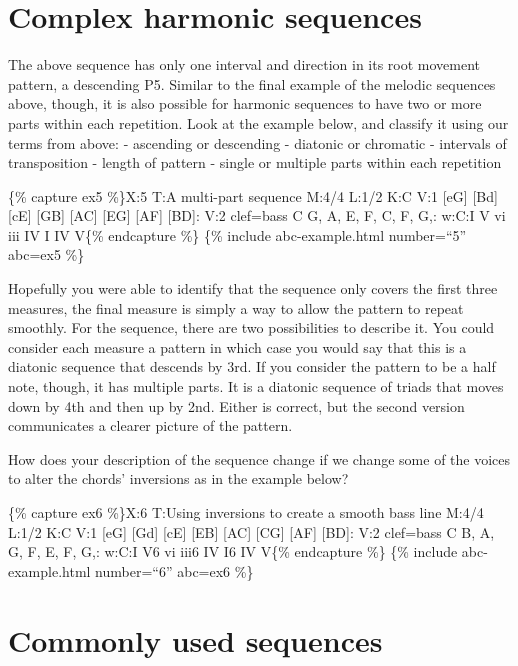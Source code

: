 \documentclass{book}
\begin{document}
\hypertarget{complex-harmonic-sequences}{%
\section{Complex harmonic sequences}\label{complex-harmonic-sequences}}

The above sequence has only one interval and direction in its root movement
pattern, a descending P5. Similar to the final example of the melodic
sequences above, though, it is also possible for harmonic sequences to have
two or more parts within each repetition. Look at the example below, and
classify it using our terms from above: - ascending or descending - diatonic
or chromatic - intervals of transposition - length of pattern - single or
multiple parts within each repetition

\{\% capture ex5 \%\}X:5 T:A multi-part sequence M:4/4 L:1/2 K:C V:1 {[}eG{]}
{[}Bd{]}\textbar{} {[}cE{]} {[}GB{]}\textbar{} {[}AC{]} {[}EG{]}\textbar{}
{[}AF{]} {[}BD{]}:\textbar{} V:2 clef=bass C G,\textbar{} A, E,\textbar{} F,
C,\textbar{} F, G,:\textbar{} w:C:I V vi iii IV I IV V\{\% endcapture \%\}
\{\% include abc-example.html number=``5'' abc=ex5 \%\}

Hopefully you were able to identify that the sequence only covers the first
three measures, the final measure is simply a way to allow the pattern to
repeat smoothly. For the sequence, there are two possibilities to describe it.
You could consider each measure a pattern in which case you would say that
this is a diatonic sequence that descends by 3rd. If you consider the pattern
to be a half note, though, it has multiple parts. It is a diatonic sequence of
triads that moves down by 4th and then up by 2nd. Either is correct, but the
second version communicates a clearer picture of the pattern.

How does your description of the sequence change if we change some of the
voices to alter the chords' inversions as in the example below?

\{\% capture ex6 \%\}X:6 T:Using inversions to create a smooth bass line M:4/4
L:1/2 K:C V:1 {[}eG{]} {[}Gd{]}\textbar{} {[}cE{]} {[}EB{]}\textbar{} {[}AC{]}
{[}CG{]}\textbar{} {[}AF{]} {[}BD{]}:\textbar{} V:2 clef=bass C B,\textbar{}
A, G,\textbar{} F, E,\textbar{} F, G,:\textbar{} w:C:I V6 vi iii6 IV I6 IV
V\{\% endcapture \%\} \{\% include abc-example.html number=``6'' abc=ex6 \%\}

\hypertarget{commonly-used-sequences}{%
\section{Commonly used sequences}\label{commonly-used-sequences}}
\end{document}
